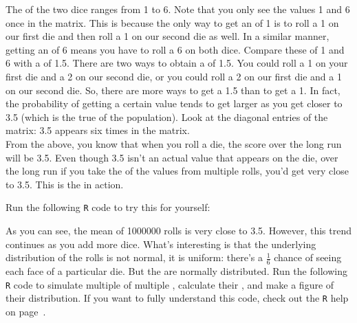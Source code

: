 
The  of the two dice ranges from 1 to 6. Note that you only see the values 1 and 6 once in the matrix. This is because the only way to get an  of 1 is to roll a 1 on our first die and then roll a 1 on our second die as well. In a similar manner, getting an  of 6 means you have to roll a 6 on both dice. Compare these  of 1 and 6 with a  of 1.5. There are two ways to obtain a  of 1.5. You could roll a 1 on your first die and a 2 on our second die, or you could roll a 2 on our first die and a 1 on our second die. So, there are more ways to get a 1.5 than to get a 1. In fact, the probability of getting a certain value tends to get larger as you get closer to 3.5 (which is the true  of the population). Look at the diagonal entries of the matrix: 3.5 appears six times in the matrix. \\

From the above, you know that when you roll a die, the  score over the long run will be 3.5. Even though 3.5 isn't an actual value that appears on the die, over the long run if you take the  of the values from multiple rolls, you'd get very close to 3.5. This is the  in action. 

\clearpage %

Run the following \texttt{R} code to try this for yourself: \\


As you can see, the mean of 1000000 rolls is very close to 3.5. However, this trend continues as you add more dice. What's interesting is that the underlying distribution of the rolls is not normal, it is uniform: there's a $\frac{1}{6}$ chance of seeing each face of a particular die. But the  are normally distributed. Run the following \texttt{R} code to simulate multiple  of multiple , calculate their , and make a figure of their distribution. If you want to fully understand this code, check out the \texttt{R} help on page~\pageref{rhelp}. \\

